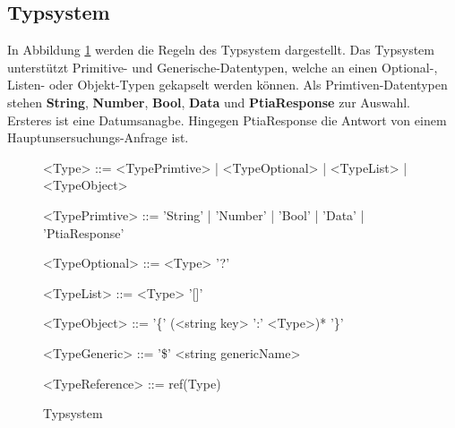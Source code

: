     \subsection{Typsystem}
    In Abbildung \cref{gra:typsystem} werden die Regeln des Typsystem dargestellt.
    Das Typsystem unterstützt Primitive- und Generische-Datentypen, welche an einen Optional-, Listen- oder Objekt-Typen gekapselt werden können.
    Als Primtiven-Datentypen stehen \textbf{String}, \textbf{Number}, \textbf{Bool}, \textbf{Data} und \textbf{PtiaResponse} zur Auswahl.
    Ersteres ist eine Datumsanagbe. Hingegen PtiaResponse die Antwort von einem Hauptunsersuchungs-Anfrage ist.
    \begin{figure}[H]
        \centering
        \begin{grammar}
            <Type> ::= <TypePrimtive> | <TypeOptional> | <TypeList> | <TypeObject>

            <TypePrimtive> ::= 'String' | 'Number' | 'Bool' | 'Data' | 'PtiaResponse'
            
            <TypeOptional> ::= <Type> '?'
            
            <TypeList> ::= <Type> '[]'
            
            <TypeObject> ::= '\{' (<string key> ':' <Type>)* '\}'

            <TypeGeneric> ::= '\$' <string genericName>

            <TypeReference> ::= ref(Type)
        \end{grammar}       
        \caption{Typsystem}
        \label{gra:typsystem}
    \end{figure}
    \noindent
